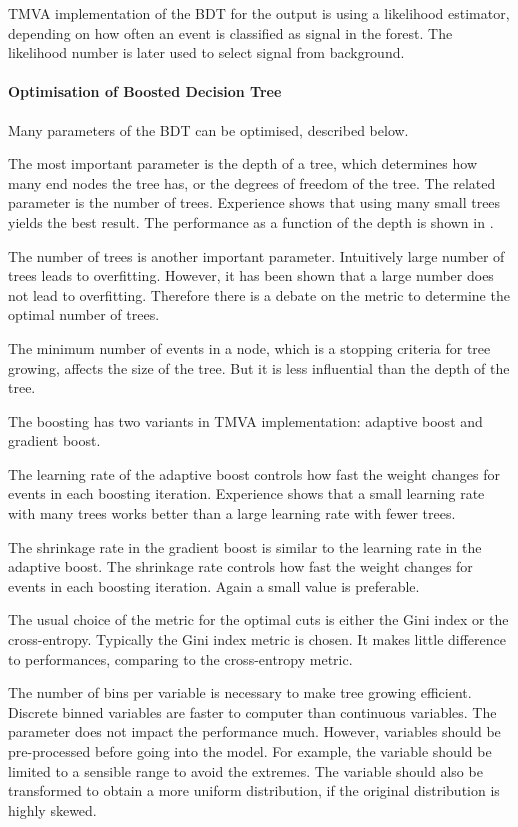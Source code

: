 TMVA implementation of the BDT for the output is using a likelihood estimator, depending on how often an event is classified as signal in the forest. The likelihood number is later used to select signal from background.

\paragraph{Optimisation of Boosted Decision Tree}
\label{sec:pandoraMVAbdtVar}
Many parameters of the BDT can be optimised, described below.

The most important parameter is the depth of a tree, which determines how many end nodes the tree has, or the degrees of freedom of the tree. The related parameter is the number of trees. Experience shows that using many small trees yields the best result. The performance as a function of the depth is shown in .

The number of trees is another important parameter. Intuitively large number of trees leads to overfitting. However, it has been shown that a large number does not lead to overfitting. Therefore there is a debate on the metric to determine the optimal number of trees.

The minimum number of events in a node, which is a stopping criteria for tree growing, affects the size of the tree. But it is less influential than the depth of the tree.

The boosting has two variants in TMVA implementation: adaptive boost and gradient boost.

The learning rate of the adaptive boost  controls how fast the weight changes for events in each boosting iteration. Experience shows that a small learning rate with many trees works better than a large learning rate with fewer trees.

The shrinkage rate in the gradient boost is similar to the learning rate in the adaptive boost. The shrinkage rate controls how fast the weight changes for events in each boosting iteration. Again a small value is preferable.

The usual choice of the metric for the optimal cuts is either the Gini index or the cross-entropy. Typically the Gini index metric is chosen. It makes little difference to performances, comparing to the cross-entropy metric.

The number of bins per variable is necessary to make tree growing efficient. Discrete binned variables are faster to computer than continuous variables. The parameter does not impact the performance much. However, variables should be pre-processed before going into the model. For example, the variable should be limited to a sensible range to avoid the extremes. The variable should also be transformed to obtain a more uniform distribution, if the original distribution is highly skewed.

